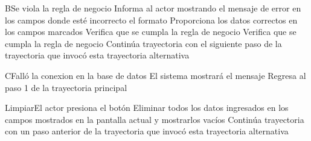 
\begin{UCtrayectoriaA}{B}{Se viola la regla de negocio }	
			\UCpaso[\UCsist] Informa al actor mostrando el mensaje de error  en los campos donde esté incorrecto el formato
			\UCpaso[\UCactor] Proporciona los datos correctos en los campos marcados
			\UCpaso[\UCsist] Verifica que se cumpla la regla de negocio  
		\UCpaso[\UCsist] Verifica que se cumpla la regla de negocio  
			\UCpaso[\UCsist] Continúa trayectoria con el siguiente paso de la trayectoria que invocó esta trayectoria alternativa
\end{UCtrayectoriaA}


\begin{UCtrayectoriaA}{C}{Falló la conexion en la base de datos}
			\UCpaso[\UCsist] El sistema mostrará el mensaje 
			\UCpaso[\UCsist] Regresa al paso 1 de la trayectoria principal  
\end{UCtrayectoriaA}


\begin{UCtrayectoriaA}{Limpiar}{El actor presiona el botón }
			\UCpaso[\UCsist] Eliminar todos los datos ingresados en los campos mostrados en la pantalla actual y mostrarlos vacíos
			\UCpaso[\UCsist] Continúa trayectoria con un paso anterior de la trayectoria que invocó esta trayectoria alternativa
\end{UCtrayectoriaA}